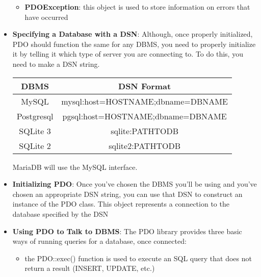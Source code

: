 \documentclass{report}
\begin{document}
\begin{itemize}
\begin{itemize}
                \item \textbf{PDOException}: this object is used to store information on errors that have occurred
            \end{itemize}
        \item \textbf{Specifying a Database with a DSN}:  Although, once properly initialized, PDO should function the same for any DBMS, you need to properly initialize it by telling it which type of server you are connecting to. To do this, you need to make a DSN string.
            \begin{center}
                \begin{tabular}{c|c}
                    DBMS &DSN Format \\
                    \hline
                    MySQL& mysql:host=HOSTNAME;dbname=DBNAME \\
                    Postgresql &pgsql:host=HOSTNAME;dbname=DBNAME \\
                    SQLite 3 &sqlite:PATHTODB \\
                    SQLite 2 &sqlite2:PATHTODB
                \end{tabular}
            \end{center}
            \bigbreak \noindent 
            MariaDB will use the MySQL interface.
        \item \textbf{Initializing PDO}: Once you’ve chosen the DBMS you’ll be using and you’ve chosen an appropriate DSN string, you can use that DSN to construct an instance of the PDO class. This object represents a connection to the database specified by the DSN
            \bigbreak \noindent 
        \item \textbf{Using PDO to Talk to DBMS}: The PDO library provides three basic ways of running queries for a database, once connected:
            \begin{itemize}
                \item the PDO::exec() function is used to execute an SQL query that does not return a result (INSERT, UPDATE, etc.)

\end{itemize}
\end{itemize}
\end{document}

